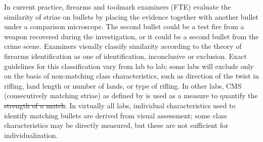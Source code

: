 \documentclass[doubleblind]{elsarticle}\usepackage[]{graphicx}\usepackage[]{color}
\providecommand{\DIFaddtex}[1]{{\protect\color{blue}\uwave{#1}}} %
\providecommand{\DIFdeltex}[1]{{\protect\color{red}\sout{#1}}}                      %
\providecommand{\DIFaddbegin}{} %
\providecommand{\DIFaddend}{} %
\providecommand{\DIFdelbegin}{} %
\providecommand{\DIFdelend}{} %
\providecommand{\DIFadd}[1]{\texorpdfstring{\DIFaddtex{#1}}{#1}} %
\providecommand{\DIFdel}[1]{\texorpdfstring{\DIFdeltex{#1}}{}} %
\newcommand{\DIFscaledelfig}{0.5}
\newlength{\DIFdelgraphicswidth} %
\newlength{\DIFdelgraphicsheight} %
\newcommand{\DIFaddincludegraphics}[2][]{{\color{blue}\fbox{\DIFOincludegraphics[#1]{#2}}}} %
\newcommand{\DIFdelincludegraphics}[2][]{%
\sbox{\DIFdelgraphicsbox}{\DIFOincludegraphics[#1]{#2}}%
\settoboxwidth{\DIFdelgraphicswidth}{\DIFdelgraphicsbox} %
\settoboxtotalheight{\DIFdelgraphicsheight}{\DIFdelgraphicsbox} %
\scalebox{\DIFscaledelfig}{%
\parbox[b]{\DIFdelgraphicswidth}{\usebox{\DIFdelgraphicsbox}\\[-\baselineskip] \rule{\DIFdelgraphicswidth}{0em}}\llap{\resizebox{\DIFdelgraphicswidth}{\DIFdelgraphicsheight}{%
\setlength{\unitlength}{\DIFdelgraphicswidth}%
\begin{picture}(1,1)%
\thicklines\linethickness{2pt} %
{\color[rgb]{1,0,0}\put(0,0){\framebox(1,1){}}}%
{\color[rgb]{1,0,0}\put(0,0){\line( 1,1){1}}}%
{\color[rgb]{1,0,0}\put(0,1){\line(1,-1){1}}}%
\end{picture}%
}\hspace*{3pt}}} %
} %
\DeclareRobustCommand{\DIFaddbegin}{\DIFOaddbegin \let\includegraphics\DIFaddincludegraphics} %
\DeclareRobustCommand{\DIFaddend}{\DIFOaddend \let\includegraphics\DIFOincludegraphics} %
\DeclareRobustCommand{\DIFdelbegin}{\DIFOdelbegin \let\includegraphics\DIFdelincludegraphics} %
\DeclareRobustCommand{\DIFdelend}{\DIFOaddend \let\includegraphics\DIFOincludegraphics} %
\begin{document}
\newcommand{\hh}[1]{{\textcolor{orange}{#1}}}
\newcommand{\svp}[1]{{\textcolor{teal}{#1}}}
\noindent






 
In current practice, firearms and toolmark examiners (FTE) evaluate the similarity of striae on bullets by placing the evidence together with another bullet under a comparison microscope. The second bullet could be a test fire from a weapon recovered during the investigation, or it could be a second bullet from the crime scene. Examiners visually classify similarity according to the theory of firearms identification \citep{identification} as one of identification, inconclusive or exclusion. Exact guidelines for this classification vary from lab to lab; some labs will exclude only on the basis of non-matching class characteristics, such as direction of the twist in rifling, land length or number of lands, or type of rifling. In other labs, CMS (consecutively matching striae) as defined by \citeauthor{biasotti} \citep{biasotti} is used as a measure to quantify the \DIFdelbegin \DIFdel{strength of a match}\DIFdelend \DIFaddbegin \DIFadd{similarity of two lands}\DIFaddend . In virtually all labs, individual characteristics used to identify matching bullets are derived from visual assessment; some class characteristics may be directly measured, but these are not sufficient for individualization. 
\end{document}
